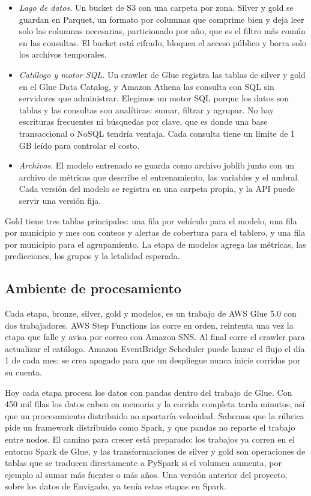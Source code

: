\documentclass[11pt,a4paper]{article}
\begin{document}
\begin{itemize}
  \item \textit{Lago de datos.} Un bucket de S3 con una carpeta por zona. Silver y gold se guardan en Parquet, un formato por columnas que comprime bien y deja leer solo las columnas necesarias, particionado por año, que es el filtro más común en las consultas. El bucket está cifrado, bloquea el acceso público y borra solo los archivos temporales.
  \item \textit{Catálogo y motor SQL.} Un crawler de Glue registra las tablas de silver y gold en el Glue Data Catalog, y Amazon Athena las consulta con SQL sin servidores que administrar. Elegimos un motor SQL porque los datos son tablas y las consultas son analíticas: sumar, filtrar y agrupar. No hay escrituras frecuentes ni búsquedas por clave, que es donde una base transaccional o NoSQL tendría ventaja. Cada consulta tiene un límite de 1 GB leído para controlar el costo.
  \item \textit{Archivos.} El modelo entrenado se guarda como archivo joblib junto con un archivo de métricas que describe el entrenamiento, las variables y el umbral. Cada versión del modelo se registra en una carpeta propia, y la API puede servir una versión fija.
\end{itemize}

Gold tiene tres tablas principales: una fila por vehículo para el modelo, una fila por municipio y mes con conteos y alertas de cobertura para el tablero, y una fila por municipio para el agrupamiento. La etapa de modelos agrega las métricas, las predicciones, los grupos y la letalidad esperada.

\subsection{Ambiente de procesamiento}

Cada etapa, bronze, silver, gold y modelos, es un trabajo de AWS Glue 5.0 con dos trabajadores. AWS Step Functions las corre en orden, reintenta una vez la etapa que falle y avisa por correo con Amazon SNS. Al final corre el crawler para actualizar el catálogo. Amazon EventBridge Scheduler puede lanzar el flujo el día 1 de cada mes; se crea apagado para que un despliegue nunca inicie corridas por su cuenta.

Hoy cada etapa procesa los datos con pandas dentro del trabajo de Glue. Con 450 mil filas los datos caben en memoria y la corrida completa tarda minutos, así que un procesamiento distribuido no aportaría velocidad. Sabemos que la rúbrica pide un framework distribuido como Spark, y que pandas no reparte el trabajo entre nodos. El camino para crecer está preparado: los trabajos ya corren en el entorno Spark de Glue, y las transformaciones de silver y gold son operaciones de tablas que se traducen directamente a PySpark si el volumen aumenta, por ejemplo al sumar más fuentes o más años. Una versión anterior del proyecto, sobre los datos de Envigado, ya tenía estas etapas en Spark.
\end{document}
